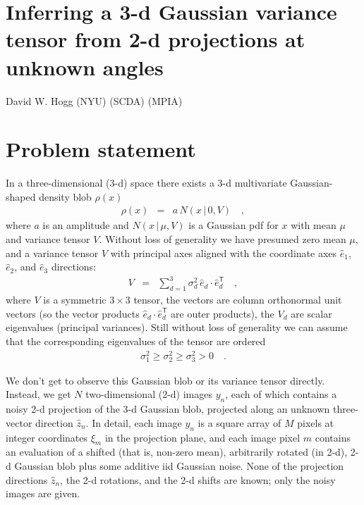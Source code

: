 \documentclass[12pt]{article}
\newcommand{\unitvec}[1]{\hat{#1}}
\newcommand{\ehat}{\unitvec{e}}
\newcommand{\zhat}{\unitvec{z}}
\newcommand{\normal}{N}
\newcommand{\given}{\,|\,}
\newcommand{\transpose}{^{\mathsf{T}}}
\begin{document}
\section*{Inferring a 3-d Gaussian variance tensor from 2-d projections at unknown angles}
\noindent
David W. Hogg (NYU) (SCDA) (MPIA)

\bigskip

\section{Problem statement}

In a three-dimensional (3-d) space there exists a 3-d multivariate
Gaussian-shaped density blob $\rho(x)$
\begin{eqnarray}
  \rho(x) &=& a\,\normal(x\given 0, V)
  \quad ,
\end{eqnarray}
where $a$ is an amplitude and $\normal(x\given\mu, V)$ is a Gaussian
pdf for $x$ with mean $\mu$ and variance tensor $V$.
Without loss of generality we have presumed zero mean $\mu$, and a
variance tensor $V$ with principal axes aligned with the coordinate
axes $\ehat_1$, $\ehat_2$, and $\ehat_3$ directions:
\begin{eqnarray}
  V &=& \sum_{d=1}^3 \sigma^2_d \, \ehat_d\cdot\ehat_d\transpose
  \quad ,
\end{eqnarray}
where $V$ is a symmetric $3\times3$ tensor, the vectors are column
orthonormal unit vectors (so the vector products
$\ehat_d\cdot\ehat_d\transpose$ are outer products), the $V_d$ are
scalar eigenvalues (principal variances).
Still without loss of generality we can assume that the corresponding
eigenvalues of the tensor are ordered
\begin{eqnarray}
  \sigma^2_1 \geq \sigma^2_2 \geq \sigma^2_3 > 0
  \quad .
\end{eqnarray}

We don't get to observe this Gaussian blob or its variance tensor
directly.
Instead, we get $N$ two-dimensional (2-d) images $y_n$, each of which
contains a noisy 2-d projection of the 3-d Gaussian blob,
projected along an unknown three-vector direction $\zhat_n$.
In detail, each image $y_n$ is a square array of $M$ pixels at integer
coordinates $\xi_m$ in the projection plane, and each image pixel $m$
contains an evaluation of a shifted (that is, non-zero mean),
arbitrarily rotated (in 2-d), 2-d Gaussian blob plus some additive iid
Gaussian noise.
None of the projection directions $\zhat_n$, the 2-d rotations, and
the 2-d shifts are known; only the noisy images are given.
\end{document}
